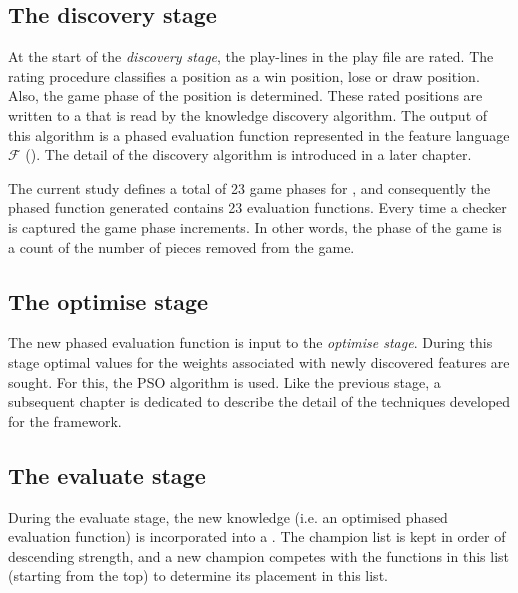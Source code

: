 \subsection*{The discovery stage}
At the start of the \textsl{discovery stage}, the play-lines in the play file are rated.  The rating procedure classifies a position as a win position, lose or draw position.  Also, the game phase of the position is determined. These rated positions are written to a  that is read by the knowledge discovery algorithm.  The output of this algorithm is a phased evaluation function represented in the feature language $\mathcal{F}$ (). The detail of the discovery algorithm is introduced in a later chapter.  

The current study defines a total of 23 game phases for , and consequently the phased function generated contains 23 evaluation functions.  Every time a checker is captured the game phase increments.  In other words, the phase of the game is a count of the number of pieces removed from the game.

\subsection*{The optimise stage}
The new phased evaluation function is input to the \textsl{optimise stage}.  During this stage optimal values for the weights associated with newly discovered features are sought. For this, the PSO algorithm is used.  Like the previous stage, a subsequent chapter is dedicated to describe the detail of the techniques developed for the framework.

\subsection*{The evaluate stage}
During the evaluate stage, the new knowledge (i.e. an optimised phased evaluation function) is incorporated into a .  The champion list is kept in order of descending strength, and a new champion competes with the functions in this list (starting from the top) to determine its placement in this list.
